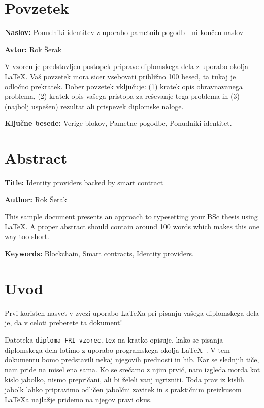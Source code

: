 \documentclass[a4paper,12pt,openright]{book}
\newcommand{\ttitle}{Ponudniki identitev z uporabo pametnih pogodb - ni končen naslov}
\newcommand{\ttitleEn}{Identity providers backed by smart contract}
\newcommand{\tauthor}{Rok Šerak}
\newcommand{\tkeywords}{Verige blokov, Pametne pogodbe, Ponudniki identitet}
\newcommand{\tkeywordsEn}{Blockchain, Smart contracts, Identity providers}
\newcommand{\clearemptydoublepage}{\newpage{\pagestyle{empty}\cleardoublepage}}
\begin{document}
\clearemptydoublepage

\chapter*{Povzetek}

\noindent\textbf{Naslov:} \ttitle
\bigskip

\noindent\textbf{Avtor:} \tauthor
\bigskip

\noindent V vzorcu je predstavljen postopek priprave diplomskega dela z uporabo okolja \LaTeX. Vaš povzetek mora sicer vsebovati približno 100 besed, ta tukaj je odločno prekratek.
Dober povzetek vključuje: (1) kratek opis obravnavanega problema, (2) kratek opis vašega pristopa za reševanje tega problema in (3) (najbolj uspešen) rezultat ali prispevek diplomske naloge.

\bigskip

\noindent\textbf{Ključne besede:} \tkeywords.
\clearemptydoublepage

\chapter*{Abstract}

\noindent\textbf{Title:} \ttitleEn
\bigskip

\noindent\textbf{Author:} \tauthor
\bigskip

\noindent This sample document presents an approach to typesetting your BSc thesis using \LaTeX. 
A proper abstract should contain around 100 words which makes this one way too short.
\bigskip

\noindent\textbf{Keywords:} \tkeywordsEn.
\clearemptydoublepage

\mainmatter
\setcounter{page}{1}
\pagestyle{fancy}

\chapter{Uvod}
Prvi koristen nasvet v zvezi uporabo \LaTeX{a} pri pisanju vašega diplomskega dela je, da v celoti preberete ta dokument!

Datoteka {\tt diploma-FRI-vzorec.tex} na kratko opisuje, kako se pisanja diplomskega dela lotimo z uporabo programskega okolja \LaTeX~\cite{lamport,nenajkrajsi}. 
V tem dokumentu bomo predstavili nekaj njegovih prednosti in hib. 
Kar se slednjih tiče, nam pride na misel ena sama. 
Ko se srečamo z njim prvič, nam izgleda morda kot kislo jabolko, nismo prepričani, ali bi želeli vanj ugrizniti. 
Toda prav iz kislih jabolk lahko pripravimo odličen jabolčni zavitek in s praktičnim preizkusom \LaTeX a najlažje pridemo na njegov pravi okus.
\end{document}
